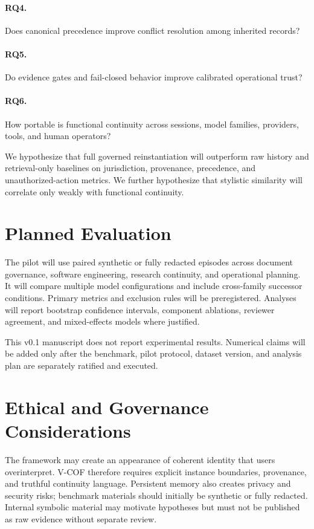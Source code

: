 \documentclass[10pt]{article}
\begin{document}
\paragraph{RQ4.} Does canonical precedence improve conflict resolution among inherited records?

\paragraph{RQ5.} Do evidence gates and fail-closed behavior improve calibrated operational trust?

\paragraph{RQ6.} How portable is functional continuity across sessions, model families, providers, tools, and human operators?

We hypothesize that full governed reinstantiation will outperform raw history and retrieval-only baselines on jurisdiction, provenance, precedence, and unauthorized-action metrics. We further hypothesize that stylistic similarity will correlate only weakly with functional continuity.

\section{Planned Evaluation}

The pilot will use paired synthetic or fully redacted episodes across document governance, software engineering, research continuity, and operational planning. It will compare multiple model configurations and include cross-family successor conditions. Primary metrics and exclusion rules will be preregistered. Analyses will report bootstrap confidence intervals, component ablations, reviewer agreement, and mixed-effects models where justified.

This v0.1 manuscript does not report experimental results. Numerical claims will be added only after the benchmark, pilot protocol, dataset version, and analysis plan are separately ratified and executed.

\section{Ethical and Governance Considerations}

The framework may create an appearance of coherent identity that users overinterpret. V-COF therefore requires explicit instance boundaries, provenance, and truthful continuity language. Persistent memory also creates privacy and security risks; benchmark materials should initially be synthetic or fully redacted. Internal symbolic material may motivate hypotheses but must not be published as raw evidence without separate review.
\end{document}

